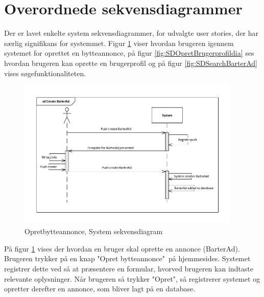 \section{Overordnede sekvensdiagrammer}
Der er lavet enkelte system sekvensdiagrammer, for udvalgte user stories, der har særlig signifikans for systemmet. Figur \ref{fig:SDOpretBytteannoncedia} viser hvordan brugeren igennem systemet for oprettet en bytteannonce, på figur \ref{fig:SDOpretBrugerprofildia} ses hvordan brugeren kan oprette en brugerprofil og  på figur \ref{fig:SDSearchBarterAd} vises søgefunktionaliteten.

\begin{figure}[H]
	\includegraphics[trim = 6mm 6mm 6mm 6mm, clip, width=0.95\textwidth]{figures/SDOpretBytteAnnonce.PDF}
	\caption{Opretbytteannonce, System sekvensdiagram }
	\label{fig:SDOpretBytteannoncedia}
	\centering
\end{figure}

\noindent På figur \ref{fig:SDOpretBytteannoncedia} vises der hvordan en bruger skal oprette en annonce (BarterAd). Brugeren trykker på en knap "Opret bytteannonce"\ på hjemmesides. Systemet registrer dette ved så at præsentere en formular, hvorved brugeren kan indtaste relevante oplysninger. Når brugeren så trykker "Opret", så registrerer systemet og opretter derefter en annonce, som bliver lagt på en database.
	
